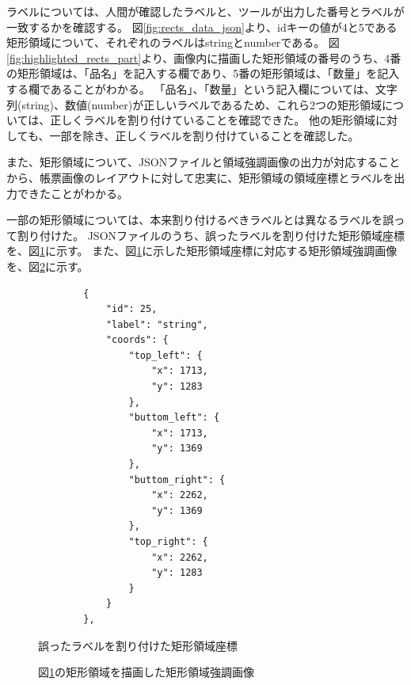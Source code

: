 ラベルについては、人間が確認したラベルと、ツールが出力した番号とラベルが一致するかを確認する。
図\ref{fig:rects_data_json}より、idキーの値が4と5である矩形領域について、それぞれのラベルはstringとnumberである。
図\ref{fig:highlighted_rects_part}より、画像内に描画した矩形領域の番号のうち、4番の矩形領域は、「品名」を記入する欄であり、5番の矩形領域は、「数量」を記入する欄であることがわかる。
「品名」、「数量」という記入欄については、文字列(string)、数値(number)が正しいラベルであるため、これら2つの矩形領域については、正しくラベルを割り付けていることを確認できた。
他の矩形領域に対しても、一部を除き、正しくラベルを割り付けていることを確認した。

また、矩形領域について、JSONファイルと領域強調画像の出力が対応することから、帳票画像のレイアウトに対して忠実に、矩形領域の領域座標とラベルを出力できたことがわかる。

一部の矩形領域については、本来割り付けるべきラベルとは異なるラベルを誤って割り付けた。
JSONファイルのうち、誤ったラベルを割り付けた矩形領域座標を、図\ref{fig:rects_data_miss_json}に示す。
また、図\ref{fig:rects_data_miss_json}に示した矩形領域座標に対応する矩形領域強調画像を、図\ref{fig:highlighted_rects_miss_part}に示す。

\lstset{language=}
\begin{figure}[t]
    \begin{lstlisting}
        {
            "id": 25,
            "label": "string",
            "coords": {
                "top_left": {
                    "x": 1713,
                    "y": 1283
                },
                "buttom_left": {
                    "x": 1713,
                    "y": 1369
                },
                "buttom_right": {
                    "x": 2262,
                    "y": 1369
                },
                "top_right": {
                    "x": 2262,
                    "y": 1283
                }
            }
        },
    \end{lstlisting}
    \caption{誤ったラベルを割り付けた矩形領域座標}\label{fig:rects_data_miss_json}
\end{figure}

\begin{figure}[t]
    \begin{center}
        \caption{図\ref{fig:rects_data_miss_json}の矩形領域を描画した矩形領域強調画像}
        \label{fig:highlighted_rects_miss_part}
    \end{center}
\end{figure}

